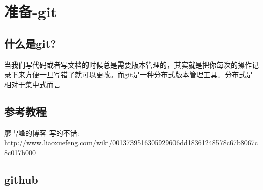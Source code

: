 \section{准备-git}
\subsection{什么是git?}
当我们写代码或者写文档的时候总是需要版本管理的，其实就是把你每次的操作记录下来方便一旦写错了就可以更改。而git是一种分布式版本管理工具。分布式是相对于集中式而言
\subsection{参考教程}
廖雪峰的博客 写的不错:\\http://www.liaoxuefeng.com/wiki/001373\newline9516305929606dd18361248578c67b8067c8c017b000

\subsection{github}

